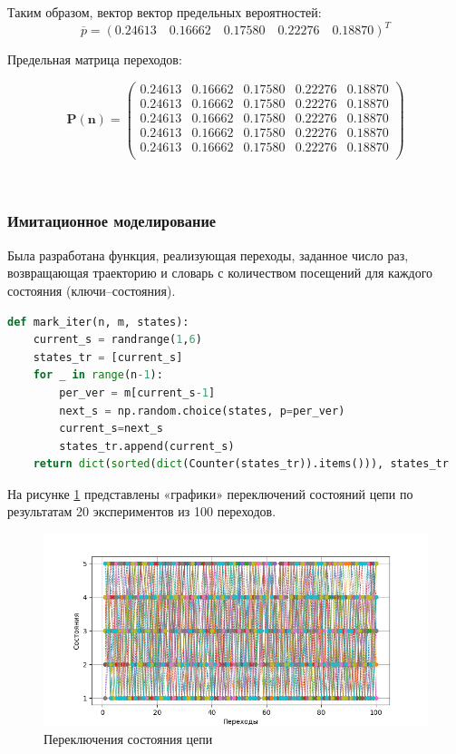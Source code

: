 Таким образом, вектор вектор предельных вероятностей:
$$\overline{p}=(0.24613\quad 0.16662\quad 0.17580\quad 0.22276\quad 0.18870)^T$$

Предельная матрица переходов:

$$\mathbf{P(n)}=\begin{pmatrix}
0.24613 & 0.16662 & 0.17580 & 0.22276 & 0.18870\\
0.24613 & 0.16662 & 0.17580 & 0.22276 & 0.18870\\
0.24613 & 0.16662 & 0.17580 & 0.22276 & 0.18870\\
0.24613 & 0.16662 & 0.17580 & 0.22276 & 0.18870\\
0.24613 & 0.16662 & 0.17580 & 0.22276 & 0.18870\\
\end{pmatrix} $$

~\\

\subsubsection{Имитационное моделирование}

Была разработана функция, реализующая переходы, заданное число раз, возвращающая траекторию и словарь с количеством посещений для каждого состояния (ключи--состояния).

\begin{lstlisting}[language=python, label=prog,caption={\textit{реализация марковского процесса}}]
def mark_iter(n, m, states):
    current_s = randrange(1,6)
    states_tr = [current_s]
    for _ in range(n-1):
        per_ver = m[current_s-1]
        next_s = np.random.choice(states, p=per_ver)
        current_s=next_s
        states_tr.append(current_s)
    return dict(sorted(dict(Counter(states_tr)).items())), states_tr
\end{lstlisting}

На рисунке \ref{iter} представлены «графики» переключений состояний цепи по результатам 20 экспериментов из 100 переходов.

\begin{figure}[!h]
\centerline{\includegraphics[width = \columnwidth]{Images/iter.png}}
\caption{Переключения состояния цепи}
\label{iter}
\end{figure}

